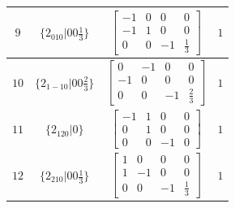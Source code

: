 \documentclass[fleqn,8pt]{jsarticle}
\begin{document}
\begin{longtable}{cccc}
$ 9 $ & $ \{2{}_{010}|0 0 \frac{1}{3}\} $ & $ \begin{bmatrix} -1 & 0 & 0 & 0 \\ -1 & 1 & 0 & 0 \\ 0 & 0 & -1 & \frac{1}{3} \end{bmatrix} $ & $ 1 $ \\ \hline
$ 10 $ & $ \{2{}_{1-10}|0 0 \frac{2}{3}\} $ & $ \begin{bmatrix} 0 & -1 & 0 & 0 \\ -1 & 0 & 0 & 0 \\ 0 & 0 & -1 & \frac{2}{3} \end{bmatrix} $ & $ 1 $ \\ \hline
$ 11 $ & $ \{2{}_{120}|0\} $ & $ \begin{bmatrix} -1 & 1 & 0 & 0 \\ 0 & 1 & 0 & 0 \\ 0 & 0 & -1 & 0 \end{bmatrix} $ & $ 1 $ \\ \hline
$ 12 $ & $ \{2{}_{210}|0 0 \frac{1}{3}\} $ & $ \begin{bmatrix} 1 & 0 & 0 & 0 \\ 1 & -1 & 0 & 0 \\ 0 & 0 & -1 & \frac{1}{3} \end{bmatrix} $ & $ 1 $ \\
\end{longtable}
\end{document}
